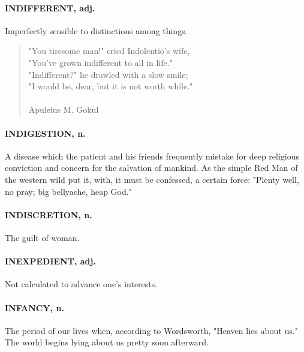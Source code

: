 \documentclass[11pt]{article}
\begin{document}
\paragraph{INDIFFERENT, adj.}  Imperfectly sensible to distinctions among things.

\begin{quote}   "You tiresome man!" cried Indolentio's wife, \\
  "You've grown indifferent to all in life." \\
  "Indifferent?" he drawled with a slow smile; \\
  "I would be, dear, but it is not worth while." \\
 \\
Apuleius M. Gokul \end{quote}


\paragraph{INDIGESTION, n.}  A disease which the patient and his friends
frequently mistake for deep religious conviction and concern for the
salvation of mankind.  As the simple Red Man of the western wild put
it, with, it must be confessed, a certain force:  "Plenty well, no
pray; big bellyache, heap God."

\paragraph{INDISCRETION, n.}  The guilt of woman.

\paragraph{INEXPEDIENT, adj.}  Not calculated to advance one's interests.

\paragraph{INFANCY, n.}  The period of our lives when, according to Wordsworth,
"Heaven lies about us."  The world begins lying about us pretty soon
afterward.
\end{document}
